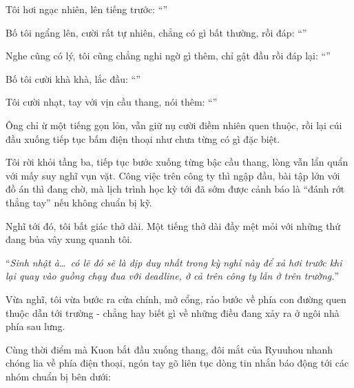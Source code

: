 \documentclass[../main.tex]{subfiles}
\begin{document}
Tôi hơi ngạc nhiên, lên tiếng trước: ``''

Bố tôi ngẩng lên, cười rất tự nhiên, chẳng có gì bất thường, rồi đáp: ``''

Nghe cũng có lý, tôi cũng chẳng nghi ngờ gì thêm, chỉ gật đầu rồi đáp lại: ``''

Bố tôi cười khà khà, lắc đầu: ``''

Tôi cười nhạt, tay với vịn cầu thang, nói thêm: ``''

Ông chỉ ừ một tiếng gọn lỏn, vẫn giữ nụ cười điềm nhiên quen thuộc, rồi lại cúi đầu xuống tiếp tục bấm điện thoại như chưa từng có gì đặc biệt.

Tôi rời khỏi tầng ba, tiếp tục bước xuống từng bậc cầu thang, lòng vẫn lẩn quẩn với mấy suy nghĩ vụn vặt. Công việc trên công ty thì ngập đầu, bài tập lớn với đồ án thì đang chờ, mà lịch trình học kỳ tới đã sớm được cảnh báo là ``đánh rớt thẳng tay'' nếu không chuẩn bị kỹ.

Nghĩ tới đó, tôi bất giác thở dài. Một tiếng thở dài đầy mệt mỏi với những thứ đang bủa vây xung quanh tôi.

``\textit{Sinh nhật à\dots\ có lẽ đó sẽ là dịp duy nhất trong kỳ nghỉ này để xả hơi trước khi lại quay vào guồng chạy đua với deadline, ở cả trên công ty lẫn ở trên trường.}''

Vừa nghĩ, tôi vừa bước ra cửa chính, mở cổng, rảo bước về phía con đường quen thuộc dẫn tới trường - chẳng hay biết gì về những điều đang xảy ra ở ngôi nhà phía sau lưng.

\pov{-}

Cùng thời điểm mà Kuon bắt đầu xuống thang, đôi mắt của Ryuuhou nhanh chóng lia về phía điện thoại, ngón tay gõ liên tục dòng tin nhắn báo động tới các nhóm chuẩn bị bên dưới:


\end{document}
